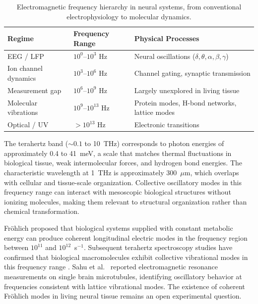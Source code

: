\documentclass[12pt,a4paper]{article}
\makeatletter
\let\orig@subsection\subsection
\renewcommand{\subsection}{\@ifstar{\orig@subsection*}{\@dblarg{\my@subsection}}}
\def\my@subsection[#1]#2{\orig@subsection[#1]{#2}\noindent\@afterindentfalse\@afterheading}
\makeatother
\begin{document}
\begin{table}[H]
\centering
\caption{Electromagnetic frequency hierarchy in neural systems, from conventional electrophysiology to molecular dynamics.}
\label{tab:freq_hierarchy}
\begin{tabular}{lll}
\toprule
\textbf{Regime} & \textbf{Frequency Range} & \textbf{Physical Processes} \\
\midrule
EEG / LFP & $10^{0}$--$10^{3}$ Hz & Neural oscillations ($\delta, \theta, \alpha, \beta, \gamma$) \\
Ion channel dynamics & $10^{3}$--$10^{6}$ Hz & Channel gating, synaptic transmission \\
Measurement gap & $10^{6}$--$10^{9}$ Hz & Largely unexplored in living tissue \\
Molecular vibrations & $10^{9}$--$10^{13}$ Hz & Protein modes, H-bond networks, lattice modes \\
Optical / UV & $>10^{13}$ Hz & Electronic transitions \\
\bottomrule
\end{tabular}
\end{table}

\subsection{The Terahertz Band}

The terahertz band ($\sim 0.1$ to 10~THz) corresponds to photon energies of approximately 0.4 to 41~meV, a scale that matches thermal fluctuations in biological tissue, weak intermolecular forces, and hydrogen bond energies.
The characteristic wavelength at 1~THz is approximately 300~$\mu$m, which overlaps with cellular and tissue-scale organization.
Collective oscillatory modes in this frequency range can interact with mesoscopic biological structures without ionizing molecules, making them relevant to structural organization rather than chemical transformation.

Fr\"{o}hlich \cite{Frohlich1968} proposed that biological systems supplied with constant metabolic energy can produce coherent longitudinal electric modes in the frequency region between $10^{11}$ and $10^{12}$~s$^{-1}$.
Subsequent terahertz spectroscopy studies have confirmed that biological macromolecules exhibit collective vibrational modes in this frequency range \cite{Markelz2008}.
Sahu et al.\ \cite{Sahu2013} reported electromagnetic resonance measurements on single brain microtubules, identifying oscillatory behavior at frequencies consistent with lattice vibrational modes.
The existence of coherent Fr\"ohlich modes in living neural tissue remains an open experimental question.
\end{document}
